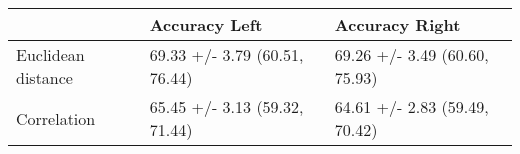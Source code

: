 \begin{tabular}{lll}
\toprule
{} &                  Accuracy Left &                 Accuracy Right \\
\midrule
Euclidean distance &  69.33 +/- 3.79 (60.51, 76.44) &  69.26 +/- 3.49 (60.60, 75.93) \\
Correlation        &  65.45 +/- 3.13 (59.32, 71.44) &  64.61 +/- 2.83 (59.49, 70.42) \\
\bottomrule
\end{tabular}
